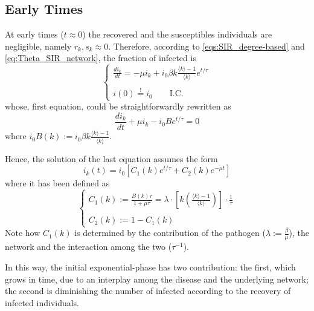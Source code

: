 \documentclass[a4paper,10pt,twoside]{book} %
\theoremstyle{definition}
\begin{document}
\subsection*{Early Times}
At early times ($t\approx 0$) the recovered and the susceptibles individuals are negligible, namely $r_k, s_k\approx0$. Therefore, according to \autoref{eqs:SIR_degree-based} and \autoref{eq:Theta_SIR_network}, the fraction of infected is \vspace{3mm}
\begin{equation}
	\begin{cases}
		\frac{di_k}{dt} = - \mu i_k + i_0 \beta k \frac{\langle k \rangle -1}{\langle k \rangle } e^{t/\tau} \\ \\
		i(0) \stackrel{!}{=} i_0 \qquad \text{I.C.}
	\end{cases}
\end{equation}
whose, first equation, could be straightforwardly rewritten as
\begin{equation}
	\frac{d i_k}{dt} + \mu i_k - i_0 B e^{t/\tau} = 0
\end{equation}
where $i_0 B(k) := i_0 \beta k \frac{\langle k \rangle -1}{\langle k \rangle }$.

Hence, the solution of the last equation assumes the form
\begin{equation}
	i_k(t)=i_0 \left[C_1(k)e^{t/\tau} + C_2(k) e^{-\mu t}\right]
\end{equation}
where it has been defined as \vspace{3mm}
\begin{equation*}
	\begin{cases}
		C_1(k):= \frac{B(k) \tau}{1+ \mu \tau} = \lambda \cdot \left[k\left(\frac{\langle k \rangle -1}{\langle k \rangle }\right)\right]
		\cdot \frac{1}{\tau} \\ \\
		C_2(k):= 1 - C_1(k)
	\end{cases}
\end{equation*}
Note how $C_1(k)$ is determined by the contribution of the pathogen ($\lambda:=\frac{\beta}{\mu}$), the network and the interaction among the two ($\tau^{-1}$).

In this way, the initial exponential-phase has two contribution: the first, which grows in time, due to an interplay among the disease and the underlying network; the second is diminishing the number of infected according to the recovery of infected individuals.
\end{document}
